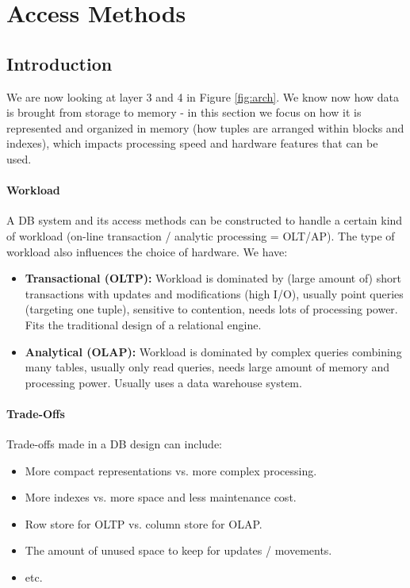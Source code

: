\section{Access Methods}


\subsection{Introduction}

We are now looking at layer 3 and 4 in Figure \ref{fig:arch}. We know now how data is brought from storage to memory - in this section we focus on how it is represented and organized in memory (how tuples are arranged within blocks and indexes), which impacts processing speed and hardware features that can be used.

\paragraph{Workload}
A DB system and its access methods can be constructed to handle a certain kind of workload (on-line transaction / analytic processing = OLT/AP). The type of workload also influences the choice of hardware. We have:
\begin{itemize}
    \item \textbf{Transactional (OLTP):} Workload is dominated by (large amount of) short transactions with updates and modifications (high I/O), usually point queries (targeting one tuple), sensitive to contention, needs lots of processing power. Fits the traditional design of a relational engine.
    \item \textbf{Analytical (OLAP):} Workload is dominated by complex queries combining many tables, usually only read queries, needs large amount of memory and processing power. Usually uses a data warehouse system.
\end{itemize}

\paragraph{Trade-Offs}
Trade-offs made in a DB design can include:
\begin{itemize}
    \item More compact representations vs. more complex processing.
    \item More indexes vs. more space and less maintenance cost.
    \item Row store for OLTP vs. column store for OLAP.
    \item The amount of unused space to keep for updates / movements.
    \item etc.
\end{itemize}


